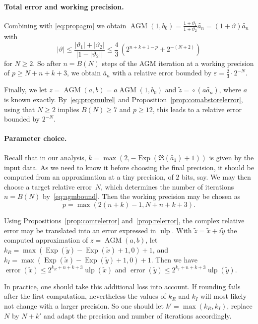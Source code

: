 \documentclass [11pt]{article}
\newcommand {\corr}[1]{{#1}}
\newcommand {\appro}[1]{\widetilde {#1}}
\newcommand {\Ulp}{{\operatorname {ulp}}}
\DeclareMathOperator{\Exp}{\operatorname {Exp}}
\newcommand{\error}{\operatorname {error}}
\newcommand {\round}{\operatorname {\circ}}
\renewcommand {\epsilon}{\varepsilon}
\renewcommand {\theta}{\vartheta}
\renewcommand {\leq}{\leqslant}
\renewcommand {\geq}{\geqslant}
\newcommand {\AGM}{\operatorname{AGM}}
\begin{document}
\paragraph {Total error and working precision.}

Combining with \eqref {eq:propagm} we obtain
$\AGM (1, b_0) = \frac {1 + \theta_1}{1 + \theta_2} \appro {a_n}
= (1 + \theta) \appro {a_n}$ with
\[
|\theta| \leq \frac {|\theta_1| + |\theta_2|}{|1 - |\theta_2||}
\leq \frac {4}{3} \, \left( 2^{n+k+1-p} + 2^{-(N+2)} \right)
\]
for $N \geq 2$.
So after $n = B (N)$ steps of the AGM iteration at a working precision
of $p \geq N + n + k + 3$, we obtain $\appro {a_n}$ with a relative error
bounded by $\epsilon = \frac {2}{3} \cdot 2^{-N}$.

Finally, we let $\corr {z} = \AGM (a, b) = a \AGM (1, \corr {b_0})$ and
$\appro {z} = \round (\corr {a} \appro {a_n})$, where $a$ is known
exactly.
By~\eqref {eq:propmulrel} and Proposition~\ref {prop:comabstorelerror},
using that $N \geq 2$ implies $B (N) \geq 7$ and $p \geq 12$,
this leads to a relative error bounded by $2^{-N}$.


\paragraph {Parameter choice.}

Recall that in our analysis, $k = \max (2, - \Exp (\Re (\appro {a_1}) + 1))$
is given by the input data. As we need to know it before choosing the final
precision, it should be computed from an approximation at a tiny precision,
of $2$ bits, say.
We may then choose a target relative error~$N$,
which determines the number of iterations~$n = B (N)$ by~\eqref {eq:agmbound}.
Then the working precision may be chosen as
\[
p = \max (2 (n + k) - 1,
          N + n + k + 3).
\]

Using Propositions~\ref {prop:comrelerror} and~\ref {prop:relerror}, the
complex relative error may be translated into an error expressed in $\Ulp$.
With $\appro {z} = \appro x + i \appro y$
the computed approximation of $\corr {z} = \AGM (a, b)$, let
$k_R = \max (\Exp (\appro y) - \Exp (\appro x) + 1, 0) + 1$, and
$k_I = \max (\Exp (\appro x) - \Exp (\appro y) + 1, 0) + 1$.
Then we have
$\error (\appro x) \leq 2^{k_R + n + k + 3} \Ulp (\appro x)$ and
$\error (\appro y) \leq 2^{k_I + n + k + 3} \Ulp (\appro y)$.

In practice, one should take this additional loss into account.
If rounding fails after the first computation, nevertheless the values of
$k_R$ and $k_I$ will most likely not change with a larger precision.
So one should let $k' = \max (k_R, k_I)$, replace $N$ by $N + k'$
and adapt the precision and number of iterations accordingly.

\nocite{Baudin11,Stewart85,Priest04,muller:hal-01766584,jeannerod:ensl-01780265}


\end{document}
